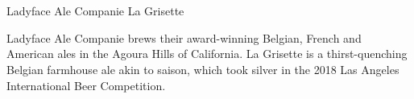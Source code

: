 \part{\stylebelgianandfrenchale}

\begin{recipie}{Ladyface Ale Companie La Grisette}

\begin{aboutblock}
Ladyface Ale Companie brews their award-winning Belgian, French and American
ales in the Agoura Hills of California. La Grisette is a thirst-quenching
Belgian farmhouse ale akin to saison, which took silver in the 2018 Las Angeles
International Beer Competition.
\end{aboutblock}


\begin{methodandtiming}
 
\begin{mashsteps}
\end{mashsteps}

\end{methodandtiming}

\pagebreak

\begin{ingredientsblock}

\begin{malts}
\end{malts}

\begin{hops}
\end{hops}

\begin{yeasts}
\end{yeasts}

\end{ingredientsblock}

\end{recipie}

